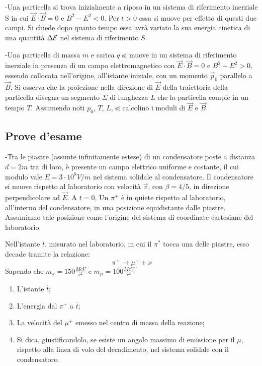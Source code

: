 \documentclass[12pt,twoside,a4]{article}
\begin{document}
\begin{esercizio}
	-Una particella si trova inizialmente a riposo in un sistema di riferimento inerziale S in cui $\vec E \cdot \vec B=0 $ e $B^2- E^2<0$. Per $t>0$ essa si muove per effetto di questi due campi. Si chiede dopo quanto tempo essa avrà  variato la sua energia cinetica di una quantità  $\Delta \mathcal{E}$ nel sistema di riferimento $S$.
\end{esercizio}

\begin{esercizio}
	-Una particella di massa $m$ e carica $q$ si muove in un sistema di riferimento inerziale in presenza di un campo elettromagnetico con $\vec E \cdot \vec B=0$ e $B^2 + E^2 >0$, essendo collocata nell'origine, all'istante iniziale, con un momento $\vec p_0$ parallelo a $\vec B$. Si osserva che la proiezione nella direzione di $\vec E$ della traiettoria della particella disegna un segmento $\Sigma$ di lunghezza $L$ che la particella compie in un tempo $T$. Assumendo noti $p_0$, $T$, $L$, si calcolino i moduli di $\vec E$ e $\vec B$.
\end{esercizio}

\newpage
\subsection{Prove d'esame}

\begin{esercizio}
	-Tra le piastre (assunte infinitamente estese) di un condensatore poste a distanza $d = 2m$ tra di loro, è presente un campo elettrico uniforme e costante, il cui modulo vale $E = 3 \cdot 10^8V/m$ nel sistema solidale al condensatore. Il condensatore si muove rispetto al laboratorio con velocità $\vec v$, con $\beta=4/5$, in direzione perpendicolare ad $\vec E$. A $t = 0$, Un $\pi^+$ è in quiete rispetto al laboratorio, all'interno del condensatore, in una posizione equidistante dalle piastre. Assumiamo tale posizione come l'origine del sistema di coordinate cartesiane del laboratorio.
	
	Nell'istante $\overline t$, misurato nel laboratorio, in cui il $\pi^*$ tocca una delle piastre, esso decade tramite la relazione:
	\begin{equation*}
		\pi^+\rightarrow \mu^+ + \nu
	\end{equation*}
	Sapendo che $m_\pi = 150\frac{MeV}{c^2}$ e $m_\mu = 100\frac{MeV}{c^2}$ 
	\begin{enumerate}[label=(\textit{\roman*})]
		\item L'istante $\overline t$;
		\item L'energia dal $\pi^+$ a $\overline t$;
		\item La velocità del $\mu^+$ emesso nel centro di massa della reazione;
		\item Si dica, giustificandolo, se esiste un angolo massimo di emissione per il $\mu$, rispetto alla linea di volo del decadimento, nel sistema solidale con il condensatore.
	\end{enumerate}
\end{esercizio}
\end{document}
